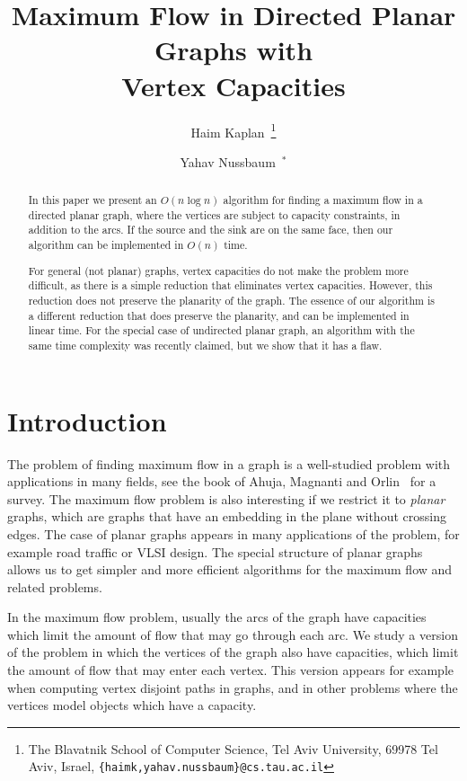 \documentclass[a4paper,11pt]{article}
\title{Maximum Flow in Directed Planar Graphs with\\Vertex Capacities}
\author{Haim Kaplan~\thanks{The Blavatnik School of Computer Science, 
Tel Aviv University, 69978 Tel Aviv, Israel, 
{\small \texttt{\{haimk,yahav.nussbaum\}@cs.tau.ac.il}}}\and Yahav Nussbaum~$^\ast$}
\date{}
\begin{document}
\maketitle

\begin{abstract}
    In this paper we present an  $O(n\log n)$ algorithm for  finding
    a maximum flow in a directed planar graph, where the vertices are subject to capacity constraints, in addition to the arcs.
    If the source and the sink are on the same face,
    then our algorithm can be implemented in  $O(n)$ time.

    For general (not planar) graphs, vertex capacities do not make the problem more difficult,
    as there is a simple reduction that eliminates vertex capacities.
    However, this reduction does not preserve the planarity of the graph.
    The essence of our algorithm is a different reduction that does preserve the planarity,
      and can be implemented in linear time.
     For the special case of undirected planar graph,
      an algorithm with the same time complexity was recently claimed, but we show that it has a flaw.
\end{abstract}

\section{Introduction}

The problem of finding maximum flow in a graph  is a well-studied
problem with applications in many fields, see the book of Ahuja,
Magnanti and Orlin~\cite{AMO93} for a survey. The maximum flow
problem is also interesting if we restrict it to \emph{planar}
graphs, which are graphs that have an embedding in the plane without
crossing edges. The case of planar graphs appears in many
applications of the problem, for example road traffic or VLSI
design. The special structure of planar graphs allows us to get simpler
and more efficient algorithms for the maximum flow and related problems.

In the maximum flow problem, usually the arcs  of the graph have
capacities which limit the amount of flow that may go through each
arc. We study a version of the problem in which the vertices of the
graph also have capacities, which limit the amount of flow that may
enter each vertex. This version appears for example when
computing vertex disjoint paths in graphs, and  in other problems
where the vertices model objects which have a capacity.
\end{document}
